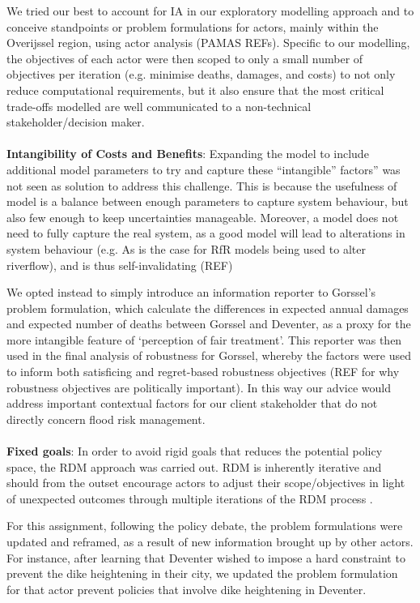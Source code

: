 We tried our best to account for IA in our exploratory modelling approach and to conceive standpoints or problem formulations for actors, mainly within the Overijssel region, using actor analysis (PAMAS REFs). Specific to our modelling, the objectives of each actor were then scoped to only a small number of objectives per iteration (e.g. minimise deaths, damages, and costs) to not only reduce computational requirements, but it also ensure that the most critical trade-offs modelled are well communicated to a non-technical stakeholder/decision maker. 
\\ \\
\textbf{Intangibility of Costs and Benefits}: Expanding the model to include additional model parameters to try and capture these “intangible” factors” was not seen as solution to address this challenge. This is because the usefulness of model is a balance between enough parameters to capture system behaviour, but also few enough to keep uncertainties manageable. Moreover, a model does not need to fully capture the real system, as a good model will lead to alterations in system behaviour (e.g. As is the case for RfR models being used to alter riverflow), and is thus self-invalidating (REF) 

We opted instead to simply introduce an information reporter to Gorssel’s problem formulation, which calculate the differences in expected annual damages and expected number of deaths between Gorssel and Deventer, as a proxy for the more intangible feature of ‘perception of fair treatment’. This reporter was then used in the final analysis of robustness for Gorssel, whereby the factors were used to inform both satisficing and regret-based robustness objectives (REF for why robustness objectives are politically important). In this way our advice would address important contextual factors for our client stakeholder that do not directly concern flood risk management. 
\\ \\
\textbf{Fixed goals}: In order to avoid rigid goals that reduces the potential policy space, the RDM approach was carried out. RDM is inherently iterative and should from the outset encourage actors to adjust their scope/objectives in light of unexpected outcomes through multiple iterations of the RDM process \parencite{lempert_general_2006}. 

For this assignment, following the policy debate, the problem formulations were updated and reframed, as a result of new information brought up by other actors. For instance, after learning that Deventer wished to impose a hard constraint to prevent the dike heightening in their city, we updated the problem formulation for that actor prevent policies that involve dike heightening in Deventer. 

